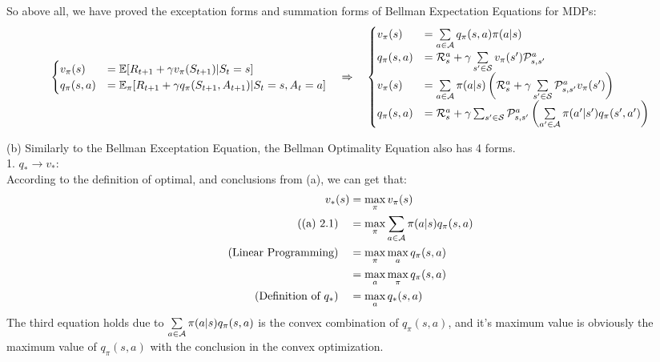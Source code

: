 \begin{homeworkProblem}
So above all, we have proved the exceptation forms and summation forms of Bellman Expectation Equations for MDPs:
$$\begin{cases}
v_{\pi}(s) &= \mathbb{E}[R_{t+1} + \gamma v_{\pi}(S_{t+1}) |S_t = s] \\
q_{\pi}(s,a) &= \mathbb{E}_{\pi}[R_{t+1}+\gamma q_{\pi}(S_{t+1}, A_{t+1})|S_t=s, A_t=a]
\end{cases} \quad \Rightarrow \quad \begin{cases}
v_{\pi}(s) &= \sum\limits_{a\in\mathcal{A}} q_{\pi}(s, a)\pi(a|s) \\
q_{\pi}(s,a) &= \mathcal{R}_s^a + \gamma \sum\limits_{s' \in \mathcal{S}}v_{\pi}(s')\mathcal{P}_{s,s'}^a \\
v_{\pi}(s) &= \sum\limits_{a\in\mathcal{A}} \pi(a|s)\left(\mathcal{R}_s^a + \gamma \sum\limits_{s' \in \mathcal{S}}\mathcal{P}_{s,s'}^av_{\pi}(s')\right) \\
q_{\pi}(s,a) &= \mathcal{R}_s^a + \gamma \sum_{s' \in \mathcal{S}}\mathcal{P}_{s,s'}^a\left(\sum\limits_{a'\in\mathcal{A}} \pi(a'|s')q_{\pi}(s', a')\right)
\end{cases}$$

(b) Similarly to the Bellman Exceptation Equation, the Bellman Optimality Equation also has 4 forms. \\
1. $q_*\to v_*$: \\
According to the definition of optimal, and conclusions from (a), we can get that:
\begin{align*}
v_*(s) &= \max_{\pi} v_{\pi}(s) \\
\text{((a) 2.1)}\quad &= \max_{\pi} \sum_{a\in\mathcal{A}} \pi(a|s)q_{\pi}(s,a) \\
\text{(Linear Programming)}\quad &= \max_{\pi}\max_{a} q_{\pi}(s,a) \\
&= \max_{a}\max_{\pi} q_{\pi}(s,a) \\
\text{(Definition of $q_*$)}\quad &= \max_{a} q_*(s,a)
\end{align*}
The third equation holds due to $\sum\limits_{a\in\mathcal{A}} \pi(a|s)q_{\pi}(s,a)$ is the convex combination of $q_{\pi}(s,a)$, and it's maximum value is obviously the maximum value of $q_{\pi}(s,a)$ with the conclusion in the convex optimization.


\end{homeworkProblem}
